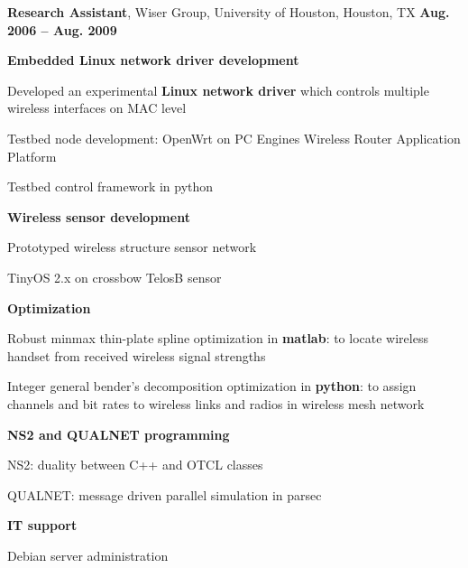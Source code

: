 \documentclass[overlapped, line]{resume}
\begin{document}
\begin{resume}
         {\bf Research Assistant}, Wiser Group, University of Houston, Houston, TX \hfill {\bf Aug. 2006 -- Aug. 2009}\\
         \vspace{-10pt}      %
         \begin{list2}
         \item \textbf{Embedded Linux network driver development}
           \begin{list2}
           \item Developed an experimental {\bf Linux network driver} which controls multiple wireless interfaces on MAC level
           \item Testbed node development: OpenWrt on PC Engines Wireless Router Application Platform
           \item Testbed control framework in python
           \end{list2}
         \item \textbf{Wireless sensor development}
           \begin{list2}
           \item Prototyped wireless structure sensor network
           \item TinyOS 2.x on crossbow TelosB sensor
           \end{list2}
         \item \textbf{Optimization}
           \begin{list2}
           \item Robust minmax thin-plate spline optimization in \textbf{matlab}: to locate wireless handset from received wireless signal strengths
           \item Integer general bender's decomposition optimization in \textbf{python}: to assign channels and bit rates to wireless links and radios in wireless mesh network
           \end{list2}
         \item \textbf{NS2 and QUALNET programming}
           \begin{list2}
           \item NS2: duality between C++ and OTCL classes
           \item QUALNET: message driven parallel simulation in parsec
           \end{list2}
         \item \textbf{IT support}
           \begin{list2}
           \item Debian server administration

\end{list2}
\end{list2}
\end{resume}
\end{document}
